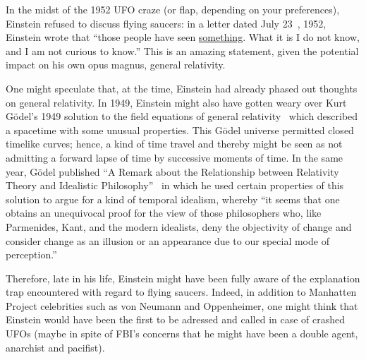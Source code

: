 In the midst of the 1952 UFO craze (or flap, depending on your preferences), Einstein refused to discuss flying saucers:
in a letter dated July 23~\cite{EinsteinGardner1952}, 1952, Einstein wrote that ``those people have seen \underline{something}.
What it is I do not know, and I am not curious to know.'' This is an amazing statement, given the potential impact on his own opus magnus,
general relativity.

One might speculate that, at the time, Einstein had already phased out thoughts on general relativity.
In 1949, Einstein might also have gotten weary over
Kurt G\"odel's 1949 solution to the field equations of general relativity~\cite{godel-rmp} which described a
spacetime with some unusual properties. This G\"odel universe permitted closed timelike curves; hence, a
kind of time travel and thereby might be seen as not admitting a forward lapse of time by successive moments of time.
In the same year,
G\"odel published ``A Remark about the Relationship between Relativity Theory and Idealistic Philosophy''~\cite{godel-sch}
in which he used certain properties of this solution to argue for a kind of temporal idealism,
whereby ``it seems that one obtains
an unequivocal proof for the view of those philosophers who,
like Parmenides, Kant, and the modern idealists, deny the objectivity of change and consider change as an illusion or an
appearance due to our special mode of perception.''

Therefore, late in his life, Einstein might have been fully aware of the explanation trap encountered
with regard to flying saucers.
Indeed, in addition to Manhatten Project celebrities such as von Neumann and Oppenheimer,
one might think that Einstein would have been the first to be adressed and called in case of crashed UFOs
(maybe in spite of FBI's concerns that he might have been a double agent, anarchist and pacifist).
